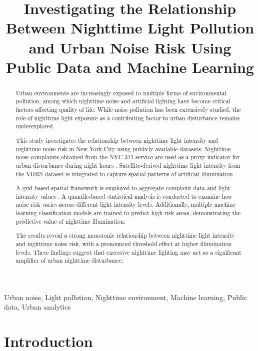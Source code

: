 \documentclass[conference]{IEEEtran}
\title{Investigating the Relationship Between Nighttime Light Pollution and Urban Noise Risk Using Public Data and Machine Learning}
\author{
\IEEEauthorblockN{Samet \"Unsal, \"Ozg\"ur Da\u{g}l\i}
\IEEEauthorblockA{
\u{I}zmir Katip \c{C}elebi University\\
}
}
\begin{document}
\maketitle

\begin{abstract}
Urban environments are increasingly exposed to multiple forms of environmental pollution,
among which nighttime noise and artificial lighting have become critical factors affecting
quality of life.
While noise pollution has been extensively studied, the role of nighttime light exposure
as a contributing factor to urban disturbance remains underexplored.

This study investigates the relationship between nighttime light intensity and nighttime
noise risk in New York City using publicly available datasets.
Nighttime noise complaints obtained from the NYC 311 service are used as a proxy indicator
for urban disturbance during night hours \cite{kontokosta2021bias,kontokosta2016using}.
Satellite-derived nighttime light intensity from the VIIRS dataset is integrated to capture
spatial patterns of artificial illumination \cite{elvidge2017viirs,kyba2017artificial}.

A grid-based spatial framework is employed to aggregate complaint data and light intensity
values \cite{elvidge2017viirs,kontokosta2016using}.
A quantile-based statistical analysis is conducted to examine how noise risk varies across
different light intensity levels.
Additionally, multiple machine learning classification models are trained to predict high-risk areas,
demonstrating the predictive value of nighttime illumination.

The results reveal a strong monotonic relationship between nighttime light intensity and
nighttime noise risk, with a pronounced threshold effect at higher illumination levels.
These findings suggest that excessive nighttime lighting may act as a significant amplifier
of urban nighttime disturbance.
\end{abstract}

\begin{IEEEkeywords}
Urban noise, Light pollution, Nighttime environment, Machine learning, Public data, Urban analytics
\end{IEEEkeywords}

\section{Introduction}
\end{document}
